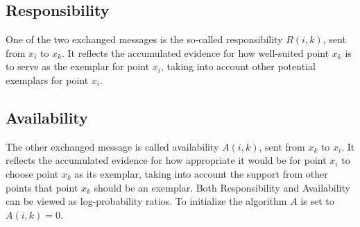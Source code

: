 \documentclass[11pt,a4paper]{article}
\begin{document}
\subsection{Responsibility}
One of the two exchanged messages is the so-called responsibility $R(i,k)$, sent from $x_i$ to $x_k$. It reflects the accumulated evidence for how well-suited point $x_k$ is to serve as the exemplar for point $x_i$, taking into account other potential exemplars for point $x_i$. \cite{frey2007clustering}
\subsection{Availability}
The other exchanged message is called availability $A(i,k)$, sent from $x_k$ to $x_i$. It reflects the accumulated evidence for how appropriate it would be for point $x_i$ to choose point $x_k$ as its exemplar, taking into account the support from other points that point $x_k$ should be an exemplar. Both Responsibility and Availability can be viewed as log-probability ratios. To initialize the algorithm $A$ is set to $A(i,k) = 0$. \cite{frey2007clustering}
\pagebreak
\end{document}
